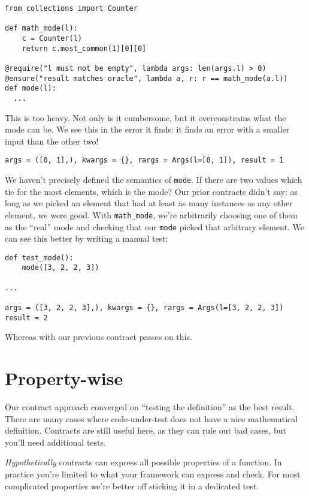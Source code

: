 \begin{verbatim}
from collections import Counter

def math_mode(l):
    c = Counter(l)
    return c.most_common(1)[0][0]

@require("l must not be empty", lambda args: len(args.l) > 0)
@ensure("result matches oracle", lambda a, r: r == math_mode(a.l))
def mode(l):
  ...
\end{verbatim}
This is too heavy. Not only is it cumbersome, but it overconstrains what
the mode can be. We see this in the error it finds: it finds an error
with a smaller input than the other two!

\begin{verbatim}
args = ([0, 1],), kwargs = {}, rargs = Args(l=[0, 1]), result = 1
\end{verbatim}
We haven't precisely defined the semantics of \texttt{mode}. If there
are two values which tie for the most elements, which is the mode? Our
prior contracts didn't say: as long as we picked an element that had at
least as many instances as any other element, we were good. With
\texttt{math\_mode}, we're arbitrarily choosing one of them as the
``real'' mode and checking that our \texttt{mode} picked that arbitrary
element. We can see this better by writing a manual test:

\begin{verbatim}
def test_mode():
    mode([3, 2, 2, 3])

...

args = ([3, 2, 2, 3],), kwargs = {}, rargs = Args(l=[3, 2, 2, 3])
result = 2
\end{verbatim}
Whereas with our previous contract passes on this.

\section{Property-wise}
\label{property-wise}

Our contract approach converged on ``testing the definition'' as the
best result. There are many cases where code-under-test does not have a
nice mathematical definition. Contracts are still useful here, as they
can rule out bad cases, but you'll need additional tests.

\emph{Hypothetically} contracts can express all possible properties of a
function. In practice you're limited to what your framework can express
and check. For most complicated properties we're better off sticking it
in a dedicated test.


